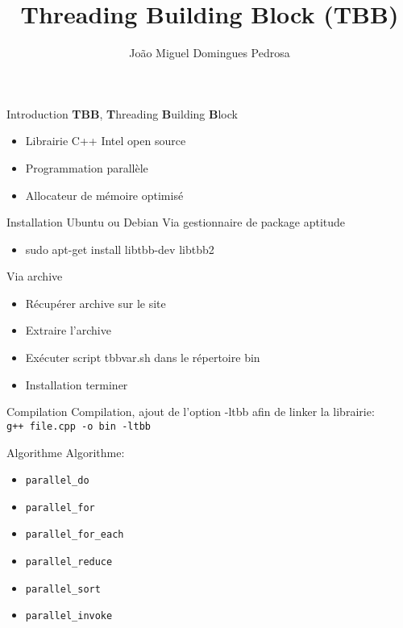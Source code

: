 \documentclass[11pt]{beamer}
\author{João Miguel Domingues Pedrosa}
\title{Threading Building Block (TBB)}
\begin{document}
\begin{frame}
\titlepage
\end{frame}


\begin{frame}{Introduction}
\textbf{TBB}, \textbf{T}hreading \textbf{B}uilding \textbf{B}lock
\begin{itemize}
	\item Librairie C++ Intel open source
	\item Programmation parallèle
	\item Allocateur de mémoire optimisé
\end{itemize}
\end{frame}

\begin{frame}{Installation}
	Ubuntu ou Debian
	Via gestionnaire de package aptitude
	\begin{itemize}
		\item sudo apt-get install libtbb-dev libtbb2
	\end{itemize}
	
	Via archive
	\begin{itemize}
		\item Récupérer archive sur le site
		\item Extraire l'archive
		\item Exécuter script tbbvar.sh dans le répertoire bin 
		\item Installation terminer
	\end{itemize}
\end{frame}

\begin{frame}{Compilation}
	Compilation, ajout de l'option -ltbb afin de linker la librairie:\\	\texttt{g++ file.cpp -o bin -ltbb}
\end{frame}

\begin{frame}{Algorithme}
	Algorithme:
	\begin{itemize}
	 	\item \texttt{parallel\_do}
	 	\item \texttt{parallel\_for}
	 	\item \texttt{parallel\_for\_each}
	 	\item \texttt{parallel\_reduce}
	 	\item \texttt{parallel\_sort}
	 	\item \texttt{parallel\_invoke}
	\end{itemize}
\end{frame}
\end{document}
